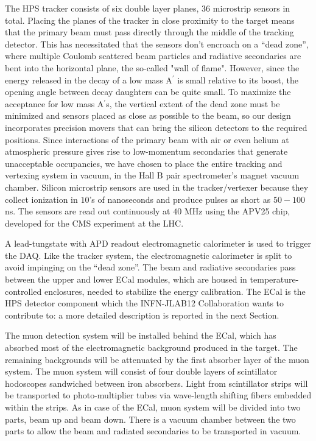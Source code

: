 \documentclass[11pt]{report}
\begin{document}
The HPS tracker consists of six double layer planes, 36 microstrip sensors in total. Placing the planes of the tracker in close proximity to the target means that the primary beam must pass directly through the middle of the tracking detector. This has necessitated that the sensors don't encroach on a “dead zone”, where multiple Coulomb scattered beam particles and radiative secondaries are bent into the horizontal plane, the so-called "wall of flame".  However, since the energy released in the decay of a low mass A$^\prime$ is small relative to its boost, the opening angle between decay daughters can be quite small. To maximize the acceptance for low mass A$^\prime$s, the vertical extent of the dead zone must be minimized and sensors placed as close as possible to the beam, so our design incorporates precision movers that can bring the silicon detectors  to the required positions. Since interactions of the primary beam with air or even helium at atmospheric pressure gives rise to low-momentum secondaries that generate unacceptable occupancies, we have chosen to place the entire tracking and vertexing system in vacuum, in the Hall B pair spectrometer's magnet vacuum chamber. Silicon microstrip sensors are used in the tracker/vertexer because they collect ionization in $10$’s of nanoseconds and produce pulses as short as $50-100$ ns. The sensors are read out continuously at $40$ MHz using the APV25 chip, developed for the CMS experiment at the LHC. 

A lead-tungstate with APD readout  electromagnetic calorimeter is used to trigger the DAQ. Like the tracker system, the electromagnetic calorimeter is split to avoid impinging on the “dead zone”. The beam and radiative secondaries pass between the upper and lower ECal modules, which are housed in temperature-controlled enclosures, needed to stabilize the energy calibration. The ECal is the HPS detector component which the INFN-JLAB12 Collaboration  wants to contribute to: a more detailed description is  reported in the next Section.

The muon detection system will be installed behind the ECal, which has absorbed most of the electromagnetic background produced in the target. The remaining backgrounds will be attenuated by the first absorber layer of the muon system. The muon system will consist of four double layers of scintillator hodoscopes sandwiched between iron absorbers. Light from scintillator strips will be transported to photo-multiplier tubes via wave-length shifting fibers embedded within the strips. As in case of the ECal, muon system will be divided into two parts, beam up and beam down. There is a vacuum chamber between the two parts to allow the beam and radiated secondaries to be transported in vacuum.
\end{document}
